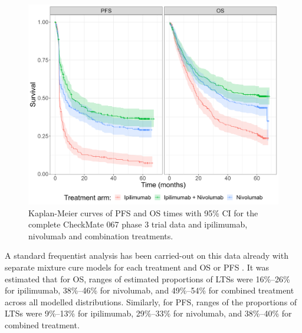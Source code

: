 \documentclass[AMA,STIX1COL]{WileyNJD-v2}
\begin{document}

\begin{figure}[!ht]
\centering
\includegraphics[width=0.6\linewidth]{km_raw_data.png}
\caption{\label{fig:S_raw_data} Kaplan-Meier curves of PFS and OS times with 95\% CI for the complete CheckMate 067 phase 3 trial data and ipilimumab, nivolumab and combination treatments.}
\end{figure}

A standard frequentist analysis has been carried-out on this data already with separate mixture cure models for each treatment and OS or PFS \cite{Mohr2020}.
It was estimated that for OS, ranges of estimated proportions of LTSs were 16\%–26\% for ipilimumab, 38\%–46\% for nivolumab, and 49\%–54\% for combined treatment across all modelled distributions.
Similarly, for PFS, ranges of the proportions of LTSs were 9\%–13\% for ipilimumab, 29\%–33\% for nivolumab, and 38\%–40\% for combined treatment.
\end{document}
